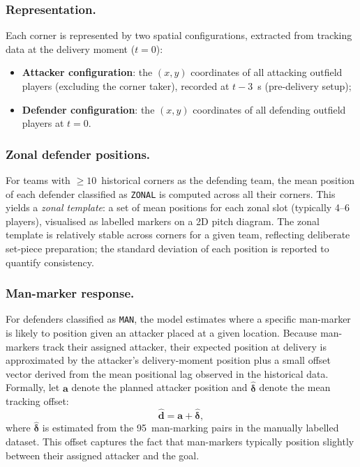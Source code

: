 \subsubsection{Representation.}
Each corner is represented by two spatial configurations, extracted from tracking
data at the delivery moment ($t = 0$):
\begin{itemize}
  \item \textbf{Attacker configuration}: the $(x, y)$ coordinates of all
        attacking outfield players (excluding the corner taker), recorded at
        $t - 3$~s (pre-delivery setup);
  \item \textbf{Defender configuration}: the $(x, y)$ coordinates of all
        defending outfield players at $t = 0$.
\end{itemize}

\subsubsection{Zonal defender positions.}
For teams with $\geq 10$~historical corners as the defending team, the mean
position of each defender classified as \texttt{ZONAL} is computed across all
their corners. This yields a \textit{zonal template}: a set of mean positions
for each zonal slot (typically 4–6 players), visualised as labelled markers
on a 2D pitch diagram. The zonal template is relatively stable across corners
for a given team, reflecting deliberate set-piece preparation; the standard
deviation of each position is reported to quantify consistency.

\subsubsection{Man-marker response.}
For defenders classified as \texttt{MAN}, the model estimates where a specific
man-marker is likely to position given an attacker placed at a given location.
Because man-markers track their assigned attacker, their expected position at
delivery is approximated by the attacker's delivery-moment position plus a
small offset vector derived from the mean positional lag observed in the
historical data. Formally, let $\mathbf{a}$ denote the planned attacker position
and $\hat{\boldsymbol{\delta}}$ denote the mean tracking offset:
\begin{equation}
  \hat{\mathbf{d}} = \mathbf{a} + \hat{\boldsymbol{\delta}},
  \label{eq:man_marker}
\end{equation}
where $\hat{\boldsymbol{\delta}}$ is estimated from the 95~man-marking pairs in
the manually labelled dataset. This offset captures the fact that man-markers
typically position slightly between their assigned attacker and the goal.

